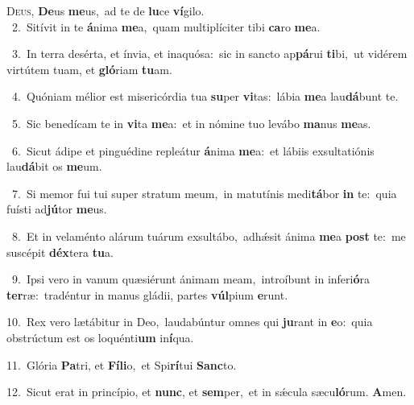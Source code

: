 \lettrine{\initial\textcolor{\initialcolor}{D}}{eus,} \textbf{De}\-us \textbf{me}\-us,~\star ad te de \textbf{lu}\-ce \textbf{ví}\-gilo.\\
{\numbfont\textcolor{\numbcolor}{~2.}}~Sitívit in te \textbf{á}\-nima \textbf{me}\-a,~\star quam multiplíciter tibi \textbf{ca}\-ro \textbf{me}\-a.\par
{\numbfont\textcolor{\numbcolor}{~3.}}~In terra desérta, et ínvia, et inaquósa:~\dagger sic in sancto ap\-\textbf{pá}\-rui \textbf{ti}\-bi,~\star ut vidérem virtútem tuam, et \textbf{gló}\-riam \textbf{tu}\-am.\par
{\numbfont\textcolor{\numbcolor}{~4.}}~Quóniam mélior est misericórdia tua \textbf{su}\-per \textbf{vi}\-tas:~\star lábia \textbf{me}\-a lau\-\textbf{dá}\-bunt te.\par
{\numbfont\textcolor{\numbcolor}{~5.}}~Sic benedícam te in \textbf{vi}\-ta \textbf{me}\-a:~\star et in nómine tuo levábo \textbf{ma}\-nus \textbf{me}\-as.\par
{\numbfont\textcolor{\numbcolor}{~6.}}~Sicut ádipe et pinguédine repleátur \textbf{á}\-nima \textbf{me}\-a:~\star et lábiis exsultatiónis lau\-\textbf{dá}\-bit os \textbf{me}\-um.\par
{\numbfont\textcolor{\numbcolor}{~7.}}~Si memor fui tui super stratum meum,~\dagger in matutínis medi\-\textbf{tá}\-bor \textbf{in} te:~\star quia fuísti ad\-\textbf{jú}\-tor \textbf{me}\-us.\par
{\numbfont\textcolor{\numbcolor}{~8.}}~Et in velaménto alárum tuárum exsultábo,~\dagger adhǽsit ánima \textbf{me}\-a \textbf{post} te:~\star me suscépit \textbf{déx}\-tera \textbf{tu}\-a.\par
{\numbfont\textcolor{\numbcolor}{~9.}}~Ipsi vero in vanum quæsiérunt ánimam meam,~\dagger introíbunt in inferi\-\textbf{ó}\-ra \textbf{ter}\-ræ:~\star tradéntur in manus gládii, partes \textbf{vúl}\-pium \textbf{e}\-runt.\par
{\numbfont\textcolor{\numbcolor}{10.}}~Rex vero lætábitur in Deo,~\dagger laudabúntur omnes qui \textbf{ju}\-rant in \textbf{e}\-o:~\star quia obstrúctum est os loquénti\textbf{um} in\-\textbf{í}\-qua.\par
{\numbfont\textcolor{\numbcolor}{11.}}~Glória \textbf{Pa}\-tri, et \textbf{Fí}\-\textbf{li}o,~\star et Spi\-\textbf{rí}\-tui \textbf{Sanc}\-to.\par
{\numbfont\textcolor{\numbcolor}{12.}}~Sicut erat in princípio, et \textbf{nunc}\-, et \textbf{sem}\-per,~\star et in sǽcula sæcu\-\textbf{ló}\-rum. \textbf{A}\-men.\par
